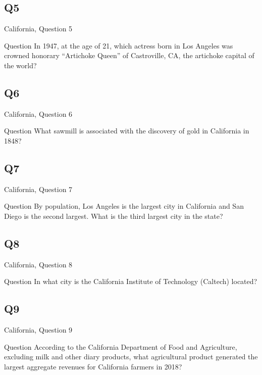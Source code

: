 \documentclass[11pt]{beamer}
\begin{document}
\subsection*{Q5}
\begin{frame}[t]{California, Question 5}
\begin{block}{Question}
In 1947, at the age of 21, which actress born in Los Angeles was crowned honorary ``Artichoke Queen'' of Castroville, CA, the artichoke capital of the world?
\end{block}
\end{frame}
\subsection*{Q6}
\begin{frame}[t]{California, Question 6}
\begin{block}{Question}
What sawmill is associated with the discovery of gold in California in 1848?
\end{block}
\end{frame}
\subsection*{Q7}
\begin{frame}[t]{California, Question 7}
\begin{block}{Question}
By population, Los Angeles is the largest city in California and San Diego is the second largest.  What is the third largest city in the state? 
\end{block}
\end{frame}
\subsection*{Q8}
\begin{frame}[t]{California, Question 8}
\begin{block}{Question}
In what city is the California Institute of Technology (Caltech) located?
\end{block}
\end{frame}
\subsection*{Q9}
\begin{frame}[t]{California, Question 9}
\begin{block}{Question}
According to the California Department of Food and Agriculture, excluding milk and other diary products, what agricultural product generated the largest aggregate revenues for California farmers in 2018?
\end{block}
\end{frame}
\end{document}
